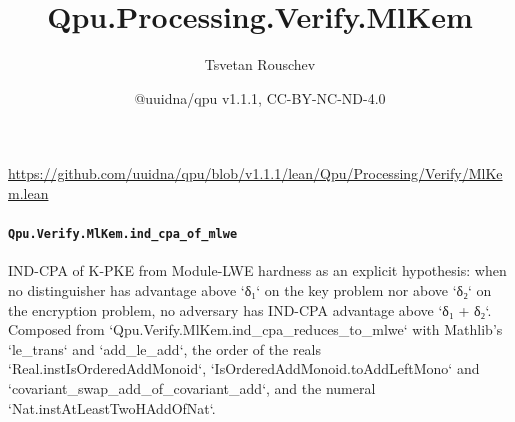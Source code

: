 \documentclass[11pt]{article}
\title{Qpu.Processing.Verify.MlKem}
\author{Tsvetan Rouschev}
\date{@uuidna/qpu v1.1.1, CC-BY-NC-ND-4.0}
\begin{document}
\maketitle
\noindent\url{https://github.com/uuidna/qpu/blob/v1.1.1/lean/Qpu/Processing/Verify/MlKem.lean}

\paragraph{\texttt{Qpu.Verify.MlKem.ind\_cpa\_of\_mlwe}}
IND-CPA of K-PKE from Module-LWE hardness as an explicit hypothesis: when no distinguisher has advantage above `δ₁` on the key problem nor above `δ₂` on the encryption problem, no adversary has IND-CPA advantage above `δ₁ + δ₂`. Composed from `Qpu.Verify.MlKem.ind\_cpa\_reduces\_to\_mlwe` with Mathlib's `le\_trans` and `add\_le\_add`, the order of the reals `Real.instIsOrderedAddMonoid`, `IsOrderedAddMonoid.toAddLeftMono` and `covariant\_swap\_add\_of\_covariant\_add`, and the numeral `Nat.instAtLeastTwoHAddOfNat`.
\end{document}
